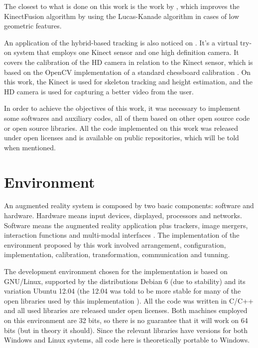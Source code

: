 \documentclass[msc, a4paper, classic, en]{ufbathesis}
\begin{document}
The closest to what is done on this work is the work by \cite{kinectkanade}, which improves the KinectFusion algorithm by using the Lucas-Kanade algorithm in cases of low geometric features.

An application of the hybrid-based tracking is also noticed on \cite{tryon}. It's a virtual try-on system that employs one Kinect sensor and one high definition camera. It covers the calibration of the HD camera in relation to the Kinect sensor, which is based on the OpenCV implementation of a standard chessboard calibration \cite{matlab}. On this work, the Kinect is used for skeleton tracking and height estimation, and the HD camera is used for capturing a better video from the user.


In order to achieve the objectives of this work, it was necessary to implement some softwares and auxiliary codes, all of them based on other open source code or open source libraries. All the code implemented on this work was released under open licenses and is available on public repositories, which will be told when mentioned.

\section{Environment}

An augmented reality system is composed by two basic components: software and hardware. Hardware means input devices, displayed, processors and networks. Software means the augmented reality application plus trackers, image mergers, interaction functions and multi-modal interfaces \cite{tori2006fundamentos}. The implementation of the environment proposed by this work involved arrangement, configuration, implementation, calibration, transformation, communication and tunning.

The development environment chosen for the implementation is based on GNU/Linux, supported by the distributions Debian 6 (due to stability) and its variation Ubuntu 12.04 (the 12.04 was told to be more stable for many of the open libraries used by this implementation \cite{pcl14}). All the code was written in C/C++ and all used libraries are released under open licenses. Both machines employed on this environment are 32 bits, so there is no guarantee that it will work on 64 bits (but in theory it should). Since the relevant libraries have versions for both Windows and Linux systems, all code here is theoretically portable to Windows.
\end{document}
